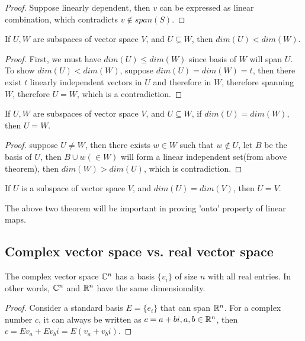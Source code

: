 \begin{refsection}
\begin{proof}
Suppose linearly dependent, then $v$ can be expressed as linear combination, which contradicts $v \notin span(S)$.
\end{proof}


\begin{theorem}
If $U,W$ are subspaces of vector space $V$, and $U\subsetneq W$, then $dim(U) < dim(W)$.
\end{theorem}
\begin{proof}
First, we must have $dim(U)\leq dim(W)$ since basis of $W$ will span $U$. To show $dim(U)<dim(W)$, suppose $dim(U)=dim(W)=t$, then there exist $t$ linearly independent vectors in $U$ and therefore in $W$, therefore spanning $W$, therefore $U=W$, which is a contradiction.
\end{proof}



\begin{theorem}\label{ch:linearalgebra:th:equaldimensionimpliesequalsubspace}
If $U,W$ are subspaces of vector space $V$, and $U\subseteq W$, if $dim(U) = dim(W)$, then $U = W$.
\end{theorem}
\begin{proof}
suppose $U\neq W$, then there exists $w\in W$ such that $w\notin U$, let $B$ be the basis of $U$, then $B\cup w (\in W)$ will form a linear independent set(from above theorem), then $dim(W) > dim(U)$, which is contradiction. 
\end{proof}
\begin{corollary}
If $U$ is a subspace of vector space $V$, and $dim(U) = dim(V)$, then $U = V$.
\end{corollary}

\begin{remark}
The above two theorem will be important in proving 'onto' property of linear maps. 
\end{remark}


\subsection{Complex vector space vs. real vector space}

\begin{lemma}
The complex vector space $\mathbb{C}^n$ has a basis $\{v_i\}$ of size $n$ with all real entries. In other words, $\mathbb{C}^n$ and $\mathbb{R}^n$ have the same dimensionality.
\end{lemma}
\begin{proof}
Consider a standard basis $E=\{e_i\}$ that can span $\mathbb{R}^n$. For a complex number $c$, it can always be written as $c =a+b i, a,b\in \mathbb{R}^n$, then $c = Ev_a + Ev_b i = E(v_a+v_b i)$.	
\end{proof}


\end{refsection}
